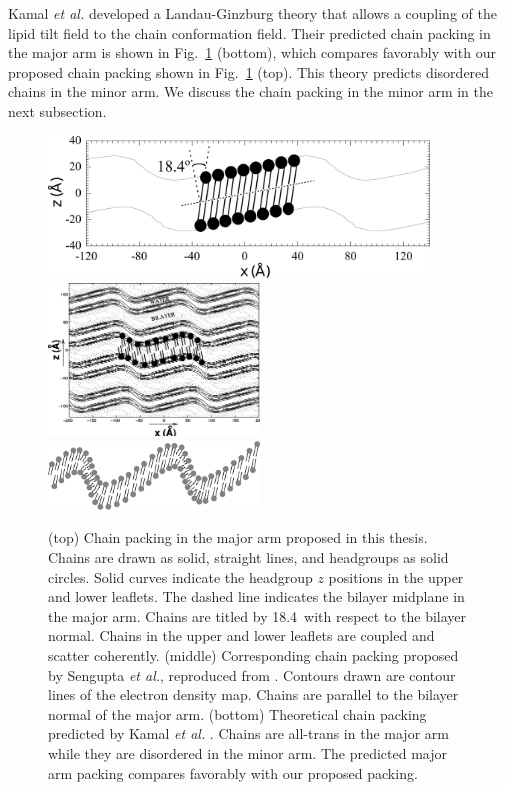 Kamal \textit{et al.} developed a Landau-Ginzburg theory that allows 
a coupling of the lipid tilt field to the chain conformation field.
Their predicted chain packing in the major arm is shown in 
Fig.~\ref{fig:major-arm_cartoon} (bottom), which compares favorably 
with our proposed chain packing shown in Fig.~\ref{fig:major-arm_cartoon} (top).
This theory predicts disordered chains in the minor arm. We discuss
the chain packing in the minor arm in the next subsection.

\begin{figure}
  \centering
  \includegraphics[width=0.9\textwidth]{figures/ripple/discussion/major-arm_cartoon}
  \includegraphics[width=0.5\textwidth]{figures/ripple/discussion/Sengupta_cartoon}  
  \includegraphics[width=0.5\textwidth]{figures/ripple/discussion/Kamal_cartoon}
  \caption[Chain packing in the major arm proposed in this thesis]
  {(top) Chain packing in the major arm proposed in this thesis.
  Chains are drawn as solid, straight lines, and headgroups as solid circles.
  Solid curves indicate the headgroup $z$ positions in the upper and 
  lower leaflets.
  The dashed line indicates the bilayer midplane in the major arm.
  Chains are titled by 18.4\textdegree\ with respect to the bilayer normal. 
  Chains in the upper and lower leaflets are coupled and scatter coherently. 
  (middle) Corresponding chain packing proposed by
  Sengupta \textit{et al.}, reproduced from \cite{ref:Sengupta03}. 
  Contours drawn are contour lines of the electron density map.
  Chains are parallel to the bilayer normal of the major arm.
  (bottom) Theoretical chain packing predicted by Kamal \textit{et al.}
  \cite{ref:Kamal11}.
  Chains are all-trans in the major arm while they are disordered in the 
  minor arm. The predicted major arm packing compares favorably with our 
  proposed packing.}
  \label{fig:major-arm_cartoon}
\end{figure}

